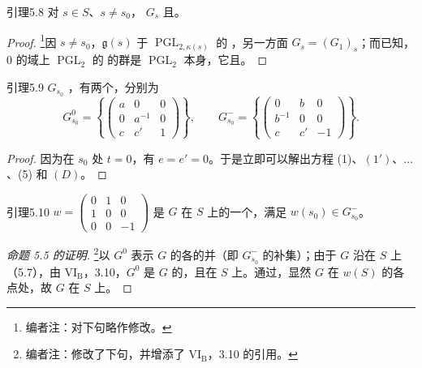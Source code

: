 \begin{SGAresult}{引理}{5.8}
对 $s\in S$、$s\ne s_0$， $G_s$ 且。
\end{SGAresult}
\begin{proof}
\footnote[41]{编者注：对下句略作修改。}因 $s\ne s_0$，$\mathfrak g(s)$ 于 $\operatorname{PGL}_{2,\kappa(s)}$ 的 ，另一方面 $G_s=(G_1)_s$；而已知， $0$ 的域上 $\operatorname{PGL}_2$ 的 的群是 $\operatorname{PGL}_2$ 本身，它且。
\end{proof}
\begin{SGAresult}{引理}{5.9}
 $G_{s_0}$ ，有两个，分别为
\[
G_{s_0}^0=\left\{\begin{pmatrix}a&0&0\\0&a^{-1}&0\\c&c'&1\end{pmatrix}\right\},\qquad
G_{s_0}^-=\left\{\begin{pmatrix}0&b&0\\b^{-1}&0&0\\c&c'&-1\end{pmatrix}\right\}.
\]
\end{SGAresult}
\begin{proof}
因为在 $s_0$ 处 $t=0$，有 $e=e'=0$。于是立即可以解出方程 (1)、$(1')$、$\ldots$、(5) 和 $(D)$。
\end{proof}
\begin{SGAresult}{引理}{5.10}
$w=\begin{pmatrix}0&1&0\\1&0&0\\0&0&-1\end{pmatrix}$ 是 $G$ 在 $S$ 上的一个，满足 $w(s_0)\in G_{s_0}^-$。
\end{SGAresult}
\begin{proof}[命题 5.5 的证明]
\footnote[42]{编者注：修改了下句，并增添了 VI$_{\mathrm B}$，3.10 的引用。}以 $G^0$ 表示 $G$ 的各的并（即 $G_{s_0}^-$ 的补集）；由于 $G$ 沿在 $S$ 上（5.7），由 VI$_{\mathrm B}$，3.10，$G^0$ 是 $G$ 的，且在 $S$ 上。通过，显然 $G$ 在 $w(S)$ 的各点处，故 $G$ 在 $S$ 上。
\end{proof}
